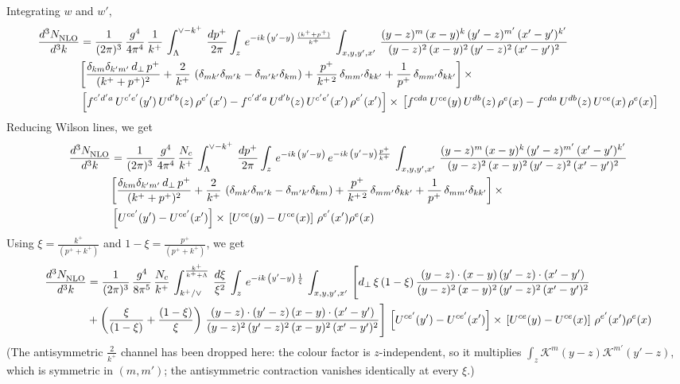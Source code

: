 \documentclass[9pt]{article}
\numberwithin{equation}{section}
\begin{document}
Integrating $w$ and $w'$,
\begin{align}
     \frac{d^{3}N_{\rm NLO}^{\rm}}{d^{3}k}  & = \frac{1}{(2\pi)^{3}}\,\frac{g^{4}}{4\pi^{4}}\,\frac{1}{k^{+}}\,\int_{\Lambda}^{\vee-k^{+}}\, \frac{dp^{+}}{2\pi}\int_{z}\,e^{-ik\,\left(y'-y\right)\, \frac{(k^{+}+p^{+})}{k^{+}}}\,\int_{x,y,y^{\prime},x'}\,\frac{(y-z)^{m}\,(x-y)^{k}\,(y'-z)^{m'}\,(x'-y')^{k'}}{(y-z)^{2}\,(x-y)^{2}\,(y'-z)^{2}\,(x'-y')^{2}}\notag \\ &  \bigg[\frac{\delta_{km}\delta_{k'm'}\,d_{\perp}\,p^{+}}{(k^{+}+p^{+})^{2}}+\frac{2}{k^{+}}\,\left(\delta_{mk'}\delta_{m'k}-\delta_{m'k'}\delta_{km}\right) + \frac{p^{+}}{k^{+\,2}}\,\delta_{mm'}\delta_{kk'}+\frac{1}{p^{+}}\,\delta_{mm'}\delta_{kk'}\bigg]\,\times\,\notag \\ & \left[f^{c'd'a}\,U^{c'e'}(y')\,U^{d'b}(z)\,\rho^{e'}(x')-f^{c'd'a}\,
    U^{d'b}(z)\,U^{c'e'}(x')\,\rho^{e'}(x')\right]\times\, \left[f^{cda}\,U^{ce}(y)\,U^{db}(z)\,\rho^{e}(x)-f^{cda}\,
    U^{db}(z)\,U^{ce}(x)\,\rho^{e}(x)\right]
\end{align}
Reducing Wilson lines, we get
\begin{align}
     \frac{d^{3}N_{\rm NLO}^{\rm}}{d^{3}k}  & = \frac{1}{(2\pi)^{3}}\,\frac{g^{4}}{4\pi^{4}}\,\frac{N_{c}}{k^{+}}\,\int_{\Lambda}^{\vee-k^{+}}\, \frac{dp^{+}}{2\pi}\int_{z}\,e^{-ik\,\left(y'-y\right)}\,e^{-ik\,\left(y'-y\right)\frac{p^{+}}{k^{+}}}\,\int_{x,y,y^{\prime},x'}\,\frac{(y-z)^{m}\,(x-y)^{k}\,(y'-z)^{m'}\,(x'-y')^{k'}}{(y-z)^{2}\,(x-y)^{2}\,(y'-z)^{2}\,(x'-y')^{2}}\notag \\ &  \bigg[\frac{\delta_{km}\delta_{k'm'}\,d_{\perp}\,p^{+}}{(k^{+}+p^{+})^{2}}+\frac{2}{k^{+}}\,\left(\delta_{mk'}\delta_{m'k}-\delta_{m'k'}\delta_{km}\right) + \frac{p^{+}}{k^{+\,2}}\,\delta_{mm'}\delta_{kk'}+\frac{1}{p^{+}}\,\delta_{mm'}\delta_{kk'}\bigg]\,\times\,\notag \\ & \left[U^{ce'}(y') - U^{ce'}(x')\right] \times\, \left[U^{ce}(y) - U^{ce}(x)\right]\, \rho^{e'}(x') \rho^{e}(x)
\end{align}
Using $\xi = \frac{k^{+}}{(p^{+}+k^{+})}$ and $1-\xi = \frac{p^{+}}{(p^{+}+k^{+})}$, we get
\begin{align}\label{eq:xiunint}
     \frac{d^{3}N_{\rm NLO}^{\rm}}{d^{3}k}  & = \frac{1}{(2\pi)^{3}}\,\frac{g^{4}}{8\pi^{5}}\,\frac{N_{c}}{k^{+}}\,\int_{k^{+}/\vee}^{\frac{k^{+}}{k^{+}+\Lambda}}\, \frac{d\xi}{\xi^{2}}\,\int_{z}\,e^{-ik\,\left(y'-y\right)\,\frac{1}{\xi}}\,\int_{x,y,y^{\prime},x'}\,\Bigg[d_{\perp}\,\xi\,(1-\xi)\,\frac{(y-z)\cdot (x-y)\,(y'-z)\cdot (x'-y')}{(y-z)^{2}\,(x-y)^{2}\,(y'-z)^{2}\, (x'-y')^{2}}\notag \\ &  + \left(\frac{\xi}{(1-\xi)}+\frac{(1-\xi)}{\xi}\right)\, \frac{(y-z)\cdot (y'-z)\, (x-y)\cdot (x'-y')}{(y-z)^{2}\, (y'-z)^{2}\, (x-y)^{2}\, (x'-y')^{2}}\Bigg]\,\left[U^{ce'}(y') - U^{ce'}(x')\right] \times\, \left[U^{ce}(y) - U^{ce}(x)\right]\, \rho^{e'}(x') \rho^{e}(x)
\end{align}
{\color{red}(The antisymmetric $\frac{2}{k^{+}}$ channel has been dropped here: the colour
factor is $z$-independent, so it multiplies $\int_{z}\mathcal K^{m}(y-z)\mathcal K^{m'}(y'-z)$,
which is symmetric in $(m,m')$; the antisymmetric contraction vanishes identically at every
$\xi$.)}
\end{document}
